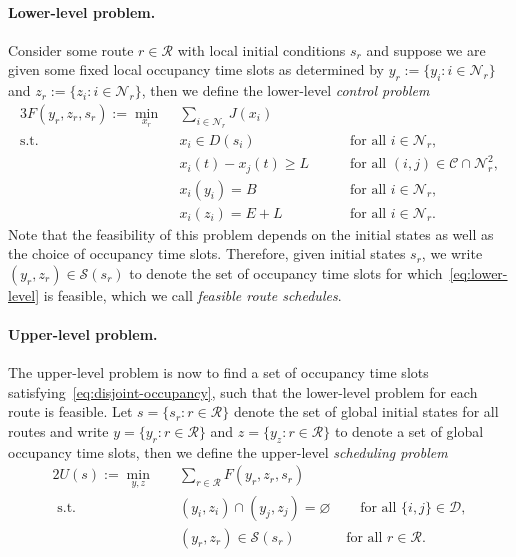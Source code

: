 \documentclass[a4paper]{report}
\theoremstyle{definition}
\theoremstyle{plain}
\begin{document}
\paragraph{Lower-level problem.}
Consider some route $r \in \mathcal{R}$ with local initial conditions $s_{r}$ and
suppose we are given some fixed local occupancy time slots as determined by
$y_{r} := \{y_{i} : i \in \mathcal{N}_{r}\}$ and
$z_{r} := \{z_{i} : i \in \mathcal{N}_{r}\}$, then we define the lower-level
\emph{control problem}
%
\begin{alignat}{3}\label{eq:lower-level}
  F(y_{r},z_{r}, s_{r}) := \min_{x_{r}} \;\, & \sum_{i \in \mathcal{N}_{r}} J(x_{i}) \tag{L} \\
  \text{s.t. } \; & x_{i} \in D(s_{i})  && \quad \text{ for all } i \in \mathcal{N}_{r} , \tag{L.1} \label{eq:L1} \\
  & x_{i}(t) - x_{j}(t) \geq L && \quad \text{ for all } (i,j) \in \mathcal{C} \cap \mathcal{N}_{r}^2 , \tag{L.2} \label{eq:L2} \\
  & x_{i}(y_i) = B  && \quad \text{ for all } i \in \mathcal{N}_{r} , \tag{L.3} \label{eq:L3} \\
  & x_{i}(z_{i}) = E + L  && \quad \text{ for all } i \in \mathcal{N}_{r} . \tag{L.4} \label{eq:L4}
\end{alignat}
%
Note that the feasibility of this problem depends on the initial states as well
as the choice of occupancy time slots. Therefore, given initial states $s_{r}$,
we write $(y_{r}, z_{r}) \in \mathcal{S}(s_{r})$ to denote the set of occupancy
time slots for which~\eqref{eq:lower-level} is feasible, which we call
\emph{feasible route schedules}.

\paragraph{Upper-level problem.}
The upper-level problem is now to find a set of occupancy time slots
satisfying~\eqref{eq:disjoint-occupancy}, such that the lower-level problem for each route is feasible.
Let $s = \{s_{r} : r \in \mathcal{R} \}$ denote the set of global initial states for
all routes and write $y = \{y_{r} : r \in \mathcal{R} \}$ and
$z = \{y_{z} : r \in \mathcal{R}\}$ to denote a set of global occupancy time slots,
then we define the upper-level \emph{scheduling problem}
%
\begin{alignat}{2}\label{eq:upper-level}
  U(s) := \min_{y, z} \quad & \sum_{r \in \mathcal{R}} F({y}_{r}, {z}_{r}, s_{r}) \tag{U} \\
  \text{ s.t. } \quad & (y_{i},z_{i}) \cap (y_{j},z_{j}) = \varnothing & \quad \text{ for all } \{i, j\} \in \mathcal{D} , \tag{U.1} \label{eq:U1} \\
                            & ({y}_{r}, {z}_{r}) \in \mathcal{S}(s_{r}) & \text{ for all } r \in \mathcal{R} . \tag{U.2}
\end{alignat}
\end{document}
